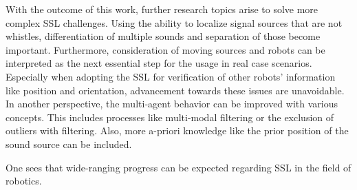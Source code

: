 With the outcome of this work, further research topics arise to solve
more complex \ac{SSL} challenges.
Using the ability to localize signal sources that are not whistles,
differentiation of multiple sounds and separation of those become important.
Furthermore, consideration of moving sources and robots can be interpreted
as the next essential step for the usage in real case scenarios.
Especially when adopting the \ac{SSL} for verification of other robots' information
like position and orientation, advancement towards these issues are unavoidable.
In another perspective, the multi-agent behavior can be improved with various
concepts.
This includes processes like multi-modal filtering or the exclusion of outliers
with filtering.
Also, more a-priori  knowledge like the prior position of the sound source can be included.

One sees that wide-ranging progress can be expected regarding \ac{SSL}
in the field of  robotics.




